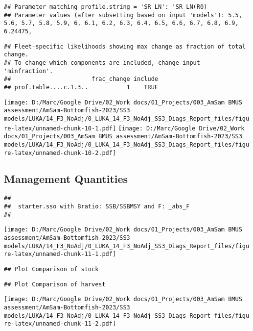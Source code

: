 \documentclass[
]{article}
\begin{document}
\begin{verbatim}
## Parameter matching profile.string = 'SR_LN': 'SR_LN(R0)
## Parameter values (after subsetting based on input 'models'): 5.5, 5.6, 5.7, 5.8, 5.9, 6, 6.1, 6.2, 6.3, 6.4, 6.5, 6.6, 6.7, 6.8, 6.9, 6.24475,
\end{verbatim}

\begin{verbatim}
## Fleet-specific likelihoods showing max change as fraction of total change.
## To change which components are included, change input 'minfraction'.
##                       frac_change include
## prof.table....c.1.3..           1    TRUE
\end{verbatim}

\texttt{[image: D:/Marc/Google Drive/02\_Work docs/01\_Projects/003\_AmSam BMUS assessment/AmSam-Bottomfish-2023/SS3 models/LUKA/14\_F3\_NoAdj/0\_LUKA\_14\_F3\_NoAdj\_SS3\_Diags\_Report\_files/figure-latex/unnamed-chunk-10-1.pdf]}
\texttt{[image: D:/Marc/Google Drive/02\_Work docs/01\_Projects/003\_AmSam BMUS assessment/AmSam-Bottomfish-2023/SS3 models/LUKA/14\_F3\_NoAdj/0\_LUKA\_14\_F3\_NoAdj\_SS3\_Diags\_Report\_files/figure-latex/unnamed-chunk-10-2.pdf]}

\hypertarget{management-quantities}{%
\subsection{Management Quantities}\label{management-quantities}}

\begin{verbatim}
## 
##  starter.sso with Bratio: SSB/SSBMSY and F: _abs_F 
## 
\end{verbatim}

\texttt{[image: D:/Marc/Google Drive/02\_Work docs/01\_Projects/003\_AmSam BMUS assessment/AmSam-Bottomfish-2023/SS3 models/LUKA/14\_F3\_NoAdj/0\_LUKA\_14\_F3\_NoAdj\_SS3\_Diags\_Report\_files/figure-latex/unnamed-chunk-11-1.pdf]}

\begin{verbatim}
## Plot Comparison of stock
\end{verbatim}

\begin{verbatim}
## Plot Comparison of harvest
\end{verbatim}

\texttt{[image: D:/Marc/Google Drive/02\_Work docs/01\_Projects/003\_AmSam BMUS assessment/AmSam-Bottomfish-2023/SS3 models/LUKA/14\_F3\_NoAdj/0\_LUKA\_14\_F3\_NoAdj\_SS3\_Diags\_Report\_files/figure-latex/unnamed-chunk-11-2.pdf]}
\end{document}
